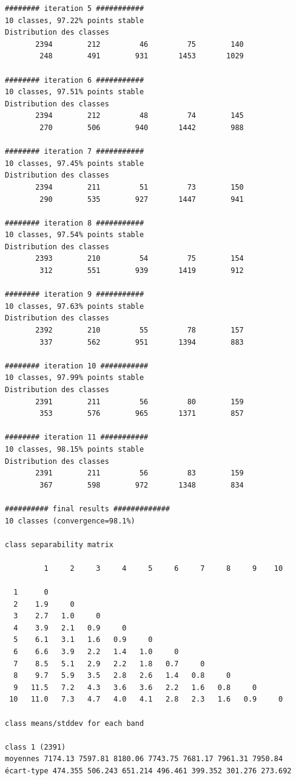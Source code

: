 \documentclass[land,article,submit,pdftex,moreauthors]{Definitions/mdpi}
\begin{document}
\begin{scriptsize}
\begin{verbatim}
######## iteration 5 ###########
10 classes, 97.22% points stable
Distribution des classes
       2394        212         46         75        140
        248        491        931       1453       1029

######## iteration 6 ###########
10 classes, 97.51% points stable
Distribution des classes
       2394        212         48         74        145
        270        506        940       1442        988

######## iteration 7 ###########
10 classes, 97.45% points stable
Distribution des classes
       2394        211         51         73        150
        290        535        927       1447        941

######## iteration 8 ###########
10 classes, 97.54% points stable
Distribution des classes
       2393        210         54         75        154
        312        551        939       1419        912

######## iteration 9 ###########
10 classes, 97.63% points stable
Distribution des classes
       2392        210         55         78        157
        337        562        951       1394        883

######## iteration 10 ###########
10 classes, 97.99% points stable
Distribution des classes
       2391        211         56         80        159
        353        576        965       1371        857

######## iteration 11 ###########
10 classes, 98.15% points stable
Distribution des classes
       2391        211         56         83        159
        367        598        972       1348        834

########## final results #############
10 classes (convergence=98.1%)

class separability matrix

         1     2     3     4     5     6     7     8     9    10

  1      0
  2    1.9     0
  3    2.7   1.0     0
  4    3.9   2.1   0.9     0
  5    6.1   3.1   1.6   0.9     0
  6    6.6   3.9   2.2   1.4   1.0     0
  7    8.5   5.1   2.9   2.2   1.8   0.7     0
  8    9.7   5.9   3.5   2.8   2.6   1.4   0.8     0
  9   11.5   7.2   4.3   3.6   3.6   2.2   1.6   0.8     0
 10   11.0   7.3   4.7   4.0   4.1   2.8   2.3   1.6   0.9     0

class means/stddev for each band

class 1 (2391)
moyennes 7174.13 7597.81 8180.06 7743.75 7681.17 7961.31 7950.84
écart-type 474.355 506.243 651.214 496.461 399.352 301.276 273.692


\end{verbatim}
\end{scriptsize}
\end{document}
